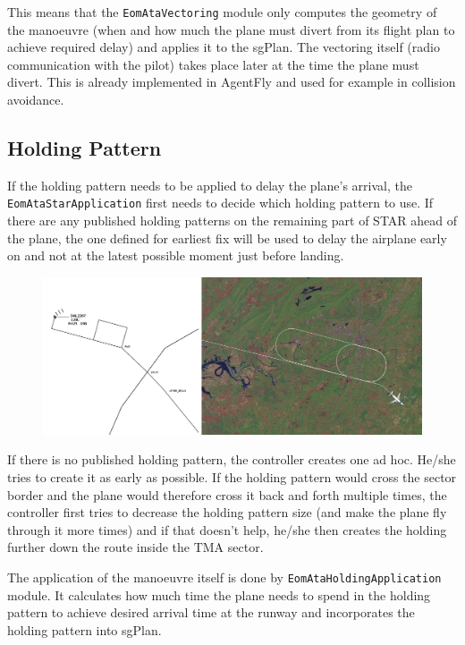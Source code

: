 This means that the \texttt{EomAtaVectoring} module only computes the geometry of the manoeuvre (when and how much the plane must divert from its flight plan to achieve required delay) and applies it to the sgPlan. The vectoring itself (radio communication with the pilot) takes place later at the time the plane must divert. This is already implemented in AgentFly and used for example in collision avoidance.

\subsection{Holding Pattern}

If the holding pattern needs to be applied to delay the plane's arrival, the \texttt{EomAtaStar\-Application} first needs to decide which holding pattern to use. If there are any published holding patterns on the remaining part of STAR ahead of the plane, the one defined for earliest fix will be used to delay the airplane early on and not at the latest possible moment just before landing.

\begin{figure}[h]
    \centering
    \includegraphics[width=\textwidth]{figures/hold.png}
    \caption{}
    \label{fig:holding-implementation}
\end{figure}

If there is no published holding pattern, the controller creates one ad hoc. He/she tries to create it as early as possible. If the holding pattern would cross the sector border and the plane would therefore cross it back and forth multiple times, the controller first tries to decrease the holding pattern size (and make the plane fly through it more times) and if that doesn't help, he/she then creates the holding further down the route inside the TMA sector.

The application of the manoeuvre itself is done by \texttt{EomAtaHoldingApplication} module. It calculates how much time the plane needs to spend in the holding pattern to achieve desired arrival time at the runway and incorporates the holding pattern into sgPlan.

